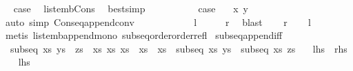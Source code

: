 \begin{isabellebody}
\ \isamarkupfalse%
\ {\isacharquery}case\ \isamarkupfalse%
\ list{\isacharunderscore}emb{\isacharunderscore}Cons{}{\isacharparenleft}{}{\isacharparenright}\ \isamarkupfalse%
\ bestsimp\ \isacommand{{\isacharbraceright}}\isamarkupfalse%
\isanewline
\ \ \ \ \ \ \isamarkupfalse%
\ \isamarkupfalse%
\ {\isacharquery}case\ \isamarkupfalse%
\ {\isacartoucheopen}{\isacharparenleft}{\isacharequal}{\isacharparenright}\ x\ y{\isacartoucheclose}\ \isamarkupfalse%
\ {\isacharparenleft}auto\ simp{\isacharcolon}\ Cons{\isacharunderscore}eq{\isacharunderscore}append{\isacharunderscore}conv{\isacharparenright}\isanewline
\ \ \ \ \isamarkupfalse%
\ \isacommand{{\isacharbraceright}}\isamarkupfalse%
\isanewline
\ \ \isamarkupfalse%
\ \isamarkupfalse%
\ {\isacharquery}l\isanewline
\ \ \isamarkupfalse%
\ \isamarkupfalse%
\ {\isacharquery}r\ \isamarkupfalse%
\ blast\isanewline
{}\isamarkupfalse%
\isanewline
\ \ \isamarkupfalse%
\ {\isacharquery}r\ \isamarkupfalse%
\ \isamarkupfalse%
\ {\isacharquery}l\ \isamarkupfalse%
\ {\isacharparenleft}metis\ list{\isacharunderscore}emb{\isacharunderscore}append{\isacharunderscore}mono\ subseq{\isacharunderscore}order{\isachardot}order{\isacharunderscore}refl{\isacharparenright}\isanewline
{}\isamarkupfalse%
%
\endisatagproof
{\isafoldproof}%
%
\isadelimproof
\isanewline
%
\endisadelimproof
\isanewline
{}\isamarkupfalse%
\ subseq{\isacharunderscore}append{\isacharunderscore}iff{\isacharcolon}\ \isanewline
\ \ {\isachardoublequoteopen}subseq\ xs\ {\isacharparenleft}ys\ {\isacharat}\ zs{\isacharparenright}\ {\isasymlongleftrightarrow}\ {\isacharparenleft}{\isasymexists}xs{}\ xs{}{\isachardot}\ xs\ {\isacharequal}\ xs{}\ {\isacharat}\ xs{}\ {\isasymand}\ subseq\ xs{}\ ys\ {\isasymand}\ subseq\ xs{}\ zs{\isacharparenright}{\isachardoublequoteclose}\isanewline
\ \ {\isacharparenleft}\ {\isachardoublequoteopen}{\isacharquery}lhs\ {\isacharequal}\ {\isacharquery}rhs{\isachardoublequoteclose}{\isacharparenright}\isanewline
%
\isadelimproof
%
\endisadelimproof
%
\isatagproof
{}\isamarkupfalse%
\isanewline
\ \ \isamarkupfalse%
\ {\isacharquery}lhs\ \isamarkupfalse%

\end{isabellebody}
